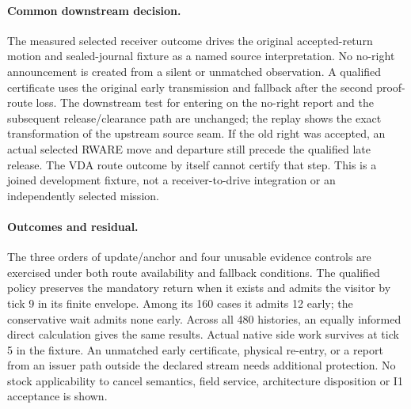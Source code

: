 \documentclass[11pt]{article}
\begin{document}
\paragraph{Common downstream decision.}
The measured selected receiver outcome drives the original
accepted-return motion and sealed-journal fixture as a named source
interpretation. No no-right announcement is created from a silent or
unmatched observation. A qualified certificate uses the original
early transmission and fallback after the second proof-route loss.
The downstream test for entering on the no-right report and the
subsequent release/clearance path are unchanged; the replay shows the
exact transformation of the upstream source seam. If the old right was
accepted, an actual selected RWARE move and departure still precede
the qualified late release. The VDA route outcome by itself cannot
certify that step. This is a joined development fixture, not a
receiver-to-drive integration or an independently selected mission.

\paragraph{Outcomes and residual.}
The three orders of update/anchor and four unusable evidence controls
are exercised under both route availability and fallback conditions.
The qualified policy preserves the mandatory return when it exists and
admits the visitor by tick 9 in its finite envelope. Among its 160
cases it admits 12 early; the conservative wait admits none early.
Across all 480 histories, an equally informed direct calculation gives
the same results. Actual native side work survives at tick 5 in the
fixture. An unmatched early certificate, physical re-entry, or a
report from an issuer path outside the declared stream needs additional
protection. No stock applicability to cancel semantics, field service,
architecture disposition or I1 acceptance is shown.
\end{document}
